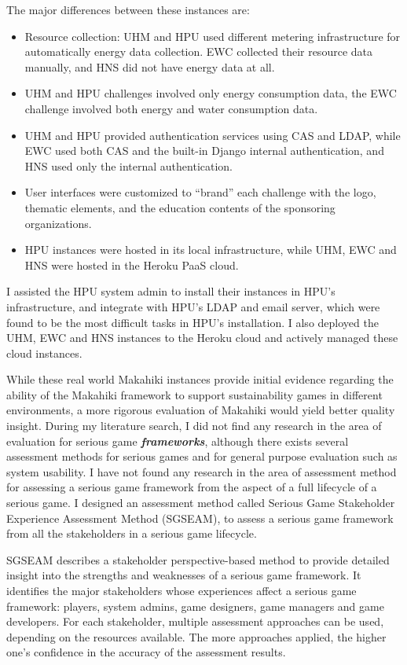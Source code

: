 The major differences between these instances are:
\begin{itemize}
\item Resource collection: UHM and HPU used different metering infrastructure for automatically energy data collection. EWC collected their resource data manually, and HNS did not have energy data at all. 
\item UHM and HPU challenges involved only energy consumption data, the EWC challenge involved both energy and water consumption data. 
\item UHM and HPU provided authentication services using CAS and LDAP, while EWC used both CAS and the built-in Django internal  authentication, and HNS used only the internal authentication.
\item User interfaces were customized to ``brand'' each challenge with the logo, thematic elements, and the education contents of the sponsoring organizations.
\item HPU instances were hosted in its local infrastructure, while UHM, EWC and HNS were hosted in the Heroku PaaS cloud.
\end{itemize}

I assisted the HPU system admin to install their instances in HPU's infrastructure, and integrate with HPU's LDAP and email server, which were found to be the most difficult tasks in HPU's installation. I also deployed the UHM, EWC and HNS instances to the Heroku cloud and actively managed these cloud instances. 

While these real world Makahiki instances provide initial evidence regarding the ability of the Makahiki framework to support sustainability games in different environments, a more rigorous evaluation of Makahiki would yield better quality insight. During my literature search, I did not find any research in the area of  evaluation for serious game {\em \bf frameworks}, although there exists several assessment methods for serious games and for general purpose evaluation such as system usability. I have not found any research in the area of assessment method for assessing a serious game framework from the aspect of a full lifecycle of a serious game. I designed an assessment method called Serious Game Stakeholder Experience Assessment Method (SGSEAM), to assess a serious game framework from all the stakeholders in a serious game lifecycle.

SGSEAM describes a stakeholder perspective-based method to provide detailed insight into the strengths and weaknesses of a serious game framework. It identifies the major stakeholders whose experiences affect a serious game framework: players, system admins, game designers, game managers and game developers. For each stakeholder, multiple assessment approaches can be used, depending on the resources available. The more approaches applied, the higher one's confidence in the accuracy of the assessment results.

